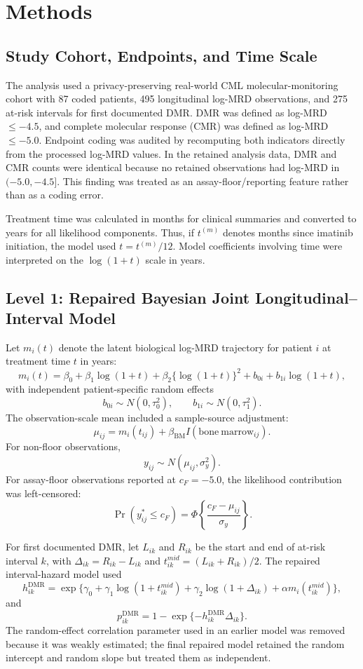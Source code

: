 \section{Methods}

\subsection{Study Cohort, Endpoints, and Time Scale}

The analysis used a privacy-preserving real-world CML molecular-monitoring cohort with 87 coded patients, 495 longitudinal log-MRD observations, and 275 at-risk intervals for first documented DMR. DMR was defined as log-MRD \(\le -4.5\), and complete molecular response (CMR) was defined as log-MRD \(\le -5.0\). Endpoint coding was audited by recomputing both indicators directly from the processed log-MRD values. In the retained analysis data, DMR and CMR counts were identical because no retained observations had log-MRD in \((-5.0,-4.5]\). This finding was treated as an assay-floor/reporting feature rather than as a coding error.

Treatment time was calculated in months for clinical summaries and converted to years for all likelihood components. Thus, if \(t^{(m)}\) denotes months since imatinib initiation, the model used \(t=t^{(m)}/12\). Model coefficients involving time were interpreted on the \(\log(1+t)\) scale in years.

\subsection{Level 1: Repaired Bayesian Joint Longitudinal--Interval Model}

Let \(m_i(t)\) denote the latent biological log-MRD trajectory for patient \(i\) at treatment time \(t\) in years:
\[
m_i(t)=\beta_0+\beta_1\log(1+t)+\beta_2\{\log(1+t)\}^2
+b_{0i}+b_{1i}\log(1+t),
\]
with independent patient-specific random effects
\[
b_{0i}\sim N(0,\tau_0^2), \qquad b_{1i}\sim N(0,\tau_1^2).
\]
The observation-scale mean included a sample-source adjustment:
\[
\mu_{ij}=m_i(t_{ij})+\beta_{\mathrm{BM}}I(\mathrm{bone\ marrow}_{ij}).
\]
For non-floor observations,
\[
y_{ij}\sim N(\mu_{ij},\sigma_y^2).
\]
For assay-floor observations reported at \(c_F=-5.0\), the likelihood contribution was left-censored:
\[
\Pr(y_{ij}^{\ast}\le c_F)=
\Phi\left\{\frac{c_F-\mu_{ij}}{\sigma_y}\right\}.
\]

For first documented DMR, let \(L_{ik}\) and \(R_{ik}\) be the start and end of at-risk interval \(k\), with \(\Delta_{ik}=R_{ik}-L_{ik}\) and \(t_{ik}^{mid}=(L_{ik}+R_{ik})/2\). The repaired interval-hazard model used
\[
h_{ik}^{\mathrm{DMR}}=
\exp\{\gamma_0+\gamma_1\log(1+t_{ik}^{mid})
+\gamma_2\log(1+\Delta_{ik})
+\alpha m_i(t_{ik}^{mid})\},
\]
and
\[
p_{ik}^{\mathrm{DMR}}=
1-\exp\{-h_{ik}^{\mathrm{DMR}}\Delta_{ik}\}.
\]
The random-effect correlation parameter used in an earlier model was removed because it was weakly estimated; the final repaired model retained the random intercept and random slope but treated them as independent.

